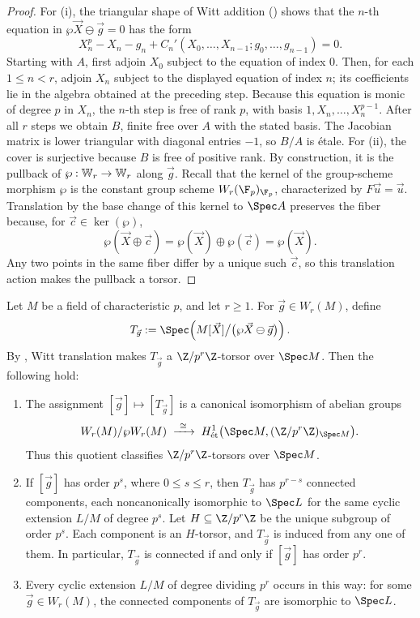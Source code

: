 \begin{proof}
For (i), the triangular shape of Witt addition
() shows that the $n$-th equation in
$\wp\vec X\ominus\vec g=0$ has the form
\[
X_n^p-X_n-g_n+C_n'(X_0,\dots,X_{n-1};g_0,\dots,g_{n-1})=0.
\]
Starting with $A$, first adjoin $X_0$ subject to the equation of index $0$.
Then, for each $1\leq n<r$, adjoin $X_n$ subject to the displayed equation
of index $n$; its coefficients lie in the algebra obtained at the preceding
step. Because this equation is monic of degree $p$ in $X_n$, the $n$-th step
is free of rank $p$, with basis $1,X_n,\dots,X_n^{p-1}$. After all $r$ steps
we obtain $B$, finite free over $A$ with the stated basis. The Jacobian matrix
is lower triangular with diagonal entries $-1$, so $B/A$ is \'etale.
For (ii), the cover is surjective because $B$ is free of positive rank.
By construction, it is the pullback of $\wp:\mathbb{W}_r\to\mathbb{W}_r$ along
$\vec g$. Recall that the kernel of
the group-scheme morphism $\wp$ is the constant group scheme
$W_r(\F_p)_{\F_p}$, characterized by $F\vec u=\vec u$. Translation by the
base change of this kernel to $\Spec A$ preserves the fiber because, for
$\vec c\in\ker(\wp)$,
\[
\wp(\vec X\oplus\vec c)=\wp(\vec X)\oplus\wp(\vec c)=\wp(\vec X).
\]
Any two points in the same fiber differ by a unique such $\vec c$, so this
translation action makes the pullback a torsor.
\end{proof}

\begin{theorem}
\label{theorem:asw_theory}
Let $M$ be a field of characteristic $p$, and let $r\geq1$. For
$\vec g\in W_r(M)$, define
\[
T_{\vec g}:=
\Spec\!\left(M[\vec X]\big/\bigl(\wp\vec X\ominus\vec g\bigr)\right).
\]
By , Witt translation makes $T_{\vec g}$ a
$\Z/p^r\Z$-torsor over $\Spec M$. Then the following hold:
\begin{enumerate}[label=(\roman*)]
\item The assignment
$[\vec g]\mapsto[T_{\vec g}]$ is a canonical isomorphism of abelian groups
\[
W_r(M)/\wp W_r(M)\;\xrightarrow{\ \cong\ }\;
H^1_{\mathrm{\acute et}}
\bigl(\Spec M,(\Z/p^r\Z)_{\Spec M}\bigr).
\]
Thus this quotient classifies $\Z/p^r\Z$-torsors over $\Spec M$.

\item If $[\vec g]$ has order $p^s$, where $0\leq s\leq r$, then $T_{\vec g}$
has $p^{r-s}$ connected components, each noncanonically isomorphic to
$\Spec L$ for the same cyclic extension $L/M$ of degree $p^s$.
Let $H\subseteq\Z/p^r\Z$ be the unique subgroup of order $p^s$.
Each component is an $H$-torsor, and $T_{\vec g}$ is induced from any one
of them. In particular, $T_{\vec g}$ is connected if and only if
$[\vec g]$ has order $p^r$.
\item Every cyclic extension $L/M$ of degree dividing $p^r$ occurs in
this way: for some $\vec g\in W_r(M)$, the connected components of
$T_{\vec g}$ are isomorphic to $\Spec L$.
\end{enumerate}
\end{theorem}

